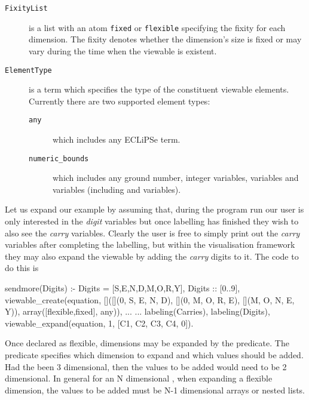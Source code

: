 \begin{description}
\item[\texttt{FixityList}] is a list with an atom \texttt{fixed} or
\texttt{flexible} specifying the fixity for each dimension. The fixity
denotes whether the dimension's size is fixed or may vary during the
time when the viewable is existent.
\item[\texttt{ElementType}] is a term which specifies the type of the
constituent viewable elements. Currently there are two supported
element types:

  \begin{description}
  \item[\texttt{any}] which includes any ECLiPSe term.
  \item[\texttt{numeric_bounds}] which includes any ground number,
  integer  variables,
   variables and
   variables (including
   and
   variables).
  \end{description}

\end{description}

Let us expand our example by assuming that, during the program run our
user is only interested in the \emph{digit} variables but once
labelling has finished they wish to also see the \emph{carry}
variables.  Clearly the user is free to simply print out the
\emph{carry} variables after completing the labelling, but within the
visualisation framework they may also expand the viewable by adding
the \emph{carry} digits to it.  The code to do this is

\begin{code}
sendmore(Digits) :-
    Digits = [S,E,N,D,M,O,R,Y],
    Digits :: [0..9],
    viewable_create(equation,
                    []([](0, S, E, N, D),
                       [](0, M, O, R, E),
                       [](M, O, N, E, Y)),
                    array([flexible,fixed], any)),
    ...
    ...
    labeling(Carries),
    labeling(Digits),
    viewable_expand(equation, 1, [C1, C2, C3, C4, 0]).
\end{code}

Once declared as flexible, dimensions may be expanded by the
\viewableexpandthree{} predicate.  The predicate specifies which
dimension to expand and which values should be added.  Had the
\viewable{} been 3 dimensional, then the values to be added would need
to be 2 dimensional.  In general for an N dimensional \viewable{},
when expanding a flexible dimension, the values to be added must be
N-1 dimensional arrays or nested lists.

